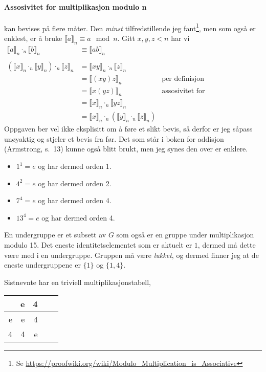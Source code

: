 \documentclass[a4paper,norsk,12pt]{article}
\begin{document}
\paragraph{Assosivitet for multiplikasjon modulo n} kan bevises på flere måter.
Den \textit{minst} tilfredstillende jeg fant\footnote{Se
\url{https://proofwiki.org/wiki/Modulo_Multiplication_is_Associative}},
men som også er enklest, er å
bruke $\llbracket a \rrbracket_n \equiv a \mod {n}$. Gitt $x,y,z < n$ har vi
\begin{align*}
  \llbracket a \rrbracket_n \cdot_n \llbracket b \rrbracket_n &\equiv
    \llbracket ab \rrbracket_n \\
    \\
    \left(\llbracket x \rrbracket_n \cdot_n \llbracket y \rrbracket_n\right)
    \cdot_n \llbracket z \rrbracket_n &= 
      \llbracket xy \rrbracket_n \cdot_n \llbracket z \rrbracket_n \\
      &= \llbracket (xy)z \rrbracket_n & \text{per definisjon} \\
      &= \llbracket x(yz) \rrbracket_n & \text{assosivitet for
    heltallsmultiplikasjon} \\
      &= \llbracket x \rrbracket_n \cdot_n \llbracket yz \rrbracket_n \\
      &= \llbracket x \rrbracket_n \cdot_n \left( \llbracket y \rrbracket_n
    \cdot_n \llbracket z \rrbracket_n \right)
\end{align*}
Oppgaven ber vel ikke eksplisitt om å føre et slikt bevis, så derfor er jeg
såpass unøyaktig og stjeler et bevis fra før. Det som står i boken for addisjon
(Armstrong, s.~13) kunne også blitt brukt, men jeg synes den over er enklere.

\begin{itemize}
  \item $1^1 = e$ og har dermed orden 1.
  \item $4^2 = e$ og har dermed orden 2.
  \item $7^4 = e$ og har dermed orden 4.
  \item $13^4 = e$ og har dermed orden 4.
\end{itemize}

En undergruppe er et subsett av $G$ som også er en gruppe under multiplikasjon
modulo 15. Det eneste identitetselementet som er aktuelt er $1$, dermed må
dette være med i en undergruppe. Gruppen må være \textit{lukket}, og dermed
finner jeg at de eneste undergruppene er $\{1\}$ og $\{1,4\}$.

Sistnevnte har en triviell multiplikasjonstabell,
\begin{table}[htp]
  \centering
  \begin{tabular}{r|rrrr}
       &  e &  4 \\ \hline
     e &  e &  4 \\
     4 &  4 &  e \\
  \end{tabular}
\end{table}
\end{document}
